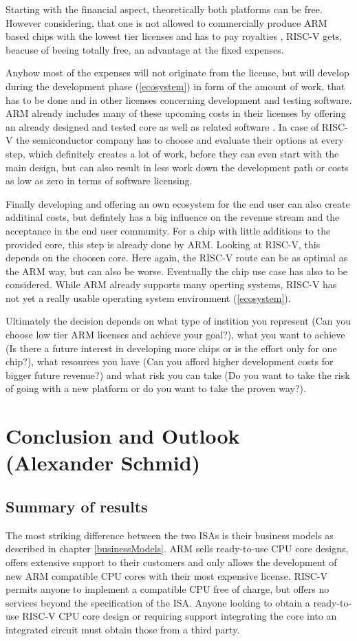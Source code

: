 \documentclass[conference]{IEEEtran}
\begin{document}
	Starting with the financial aspect, theoretically both platforms can be free. However considering, that one is not allowed to commercially produce ARM based chips with the lowest tier licenses and has to pay royalties \cite{ARMLC}, RISC-V gets, beacuse of beeing totally free, an advantage at the fixed expenses.

	Anyhow most of the expenses will not originate from the license, but will develop during the development phase (\ref{ecosystem}) in form of the amount of work, that has to be done and in other licenses concerning development and testing software. ARM already includes many of these upcoming costs in their licenses by offering an already designed and tested core as well as related software \cite{ARM2019}. In case of RISC-V the semiconductor company has to choose and evaluate their options at every step, which definitely creates a lot of work, before they can even start with the main design, but can also result in less work down the development path or costs as low as zero in terms of software licensing.

	Finally developing and offering an own ecosystem for the end user can also create additinal costs, but defintely has a big influence on the revenue stream and the acceptance in the end user community. For a chip with little additions to the provided core, this step is already done by ARM. Looking at RISC-V, this depends on the choosen core. Here again, the RISC-V route can be as optimal as the ARM way, but can also be worse. Eventually the chip use case has also to be considered. While ARM already supports many operting systems, RISC-V has not yet a really usable operating system environment (\ref{ecosystem}).

	Ultimately the decision depends on what type of instition you represent (Can you choose low tier ARM licenses and achieve your goal?), what you want to achieve (Is there a future interest in developing more chips or is the effort only for one chip?), what resources you have (Can you afford higher development costs for bigger future revenue?) and what risk you can take (Do you want to take the risk of going with a new platform or do you want to take the proven way?).


\section{Conclusion and Outlook (Alexander Schmid)}
\label{ref:conclusion}
	\subsection{Summary of results}
	The most striking difference between the two \glspl{ISA} is their business models as described in chapter \ref{businessModels}.
	ARM sells ready-to-use \gls{CPU} core designs, offers extensive support to their customers and only allows the development of new
	ARM compatible \gls{CPU} cores with their most expensive license.
	RISC-V permits anyone to implement a compatible \gls{CPU} free of charge, but offers no services beyond the specification of the \gls{ISA}.
	Anyone looking to obtain a ready-to-use RISC-V \gls{CPU} core design or requiring support integrating the core into an integrated circuit
	must obtain those from a third party.
\end{document}
